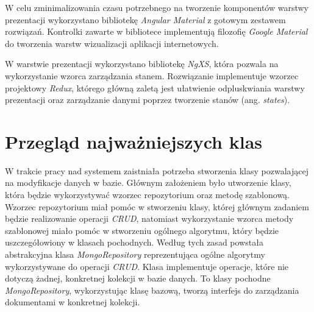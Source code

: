 \documentclass[a4paper,twoside,12pt]{book}
\newcommand{\obcy}[1]{\emph{#1}}
\newcommand{\ang}[1]{{\selectlanguage{british}\obcy{#1}}}
\begin{document}
W celu zminimalizowania czasu potrzebnego na tworzenie komponentów warstwy prezentacji wykorzystano bibliotekę \textit{Angular Material} z gotowym zestawem rozwiązań. Kontrolki zawarte w bibliotece implementują filozofię \textit{Google Material} do tworzenia warstw wizualizacji aplikacji internetowych.

W warstwie prezentacji wykorzystano bibliotekę \textit{NgXS}, która pozwala na wykorzystanie wzorca zarządzania stanem. Rozwiązanie implementuje wzorzec projektowy \textit{Redux}, którego główną zaletą jest ułatwienie odpluskwiania warstwy prezentacji oraz zarządzanie danymi poprzez tworzenie stanów (ang. \ang{states}).

\section{Przegląd najważniejszych klas}
W trakcie pracy nad systemem zaistniała potrzeba stworzenia klasy pozwalającej na modyfikacje danych w bazie. Głównym założeniem było utworzenie klasy, która będzie wykorzystywać wzorzec repozytorium oraz metodę szablonową. Wzorzec repozytorium miał pomóc w stworzeniu klasy, której głównym zadaniem będzie realizowanie operacji \textit{CRUD}, natomiast wykorzystanie wzorca metody szablonowej miało pomóc w stworzeniu ogólnego algorytmu, który będzie uszczegółowiony w klasach pochodnych. Według tych zasad powstała abstrakcyjna klasa \textit{MongoRepository} reprezentująca ogólne algorytmy wykorzystywane do operacji \textit{CRUD}. Klasa implementuje operacje, które nie dotyczą żadnej, konkretnej kolekcji w bazie danych. To klasy pochodne \textit{MongoRepository}, wykorzystując klasę bazową, tworzą interfejs do zarządzania dokumentami w konkretnej kolekcji.
\end{document}

